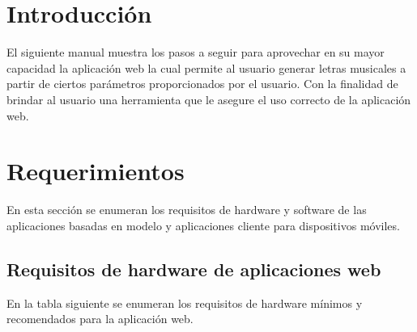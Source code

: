 \documentclass[12pt, a4paper, titlepage]{article}
\begin{document}
	\newpage
	\renewcommand\appendixpagename{Índice}
	\renewcommand\appendixtocname{Índice}
	\appendixpageoff
	\begin{appendices}
		\renewcommand*\contentsname{{\textcolor{azulescom}{Índice.}}}
		\tableofcontents
		\newpage
		\renewcommand*\listfigurename{{\textcolor{azulescom}{Índice de figuras.}}}
		\listoffigures
		\newpage
		\newpage
	\end{appendices}
	
	\section{Introducción}
	El siguiente manual muestra los pasos a seguir para aprovechar
	en su mayor capacidad la aplicación web la cual permite al usuario
	generar letras musicales a partir de ciertos parámetros proporcionados
	por el usuario. Con la finalidad de brindar al usuario una herramienta
	que le asegure el uso correcto de la aplicación web.
	
	\section{Requerimientos}
	En esta sección se enumeran los requisitos de hardware y
	software de las aplicaciones basadas en modelo y
	aplicaciones cliente para dispositivos móviles.
	
		\subsection{Requisitos de hardware de aplicaciones web}
			En la tabla siguiente se enumeran los requisitos
			de hardware mínimos y recomendados para la aplicación web.
		
\end{document}
